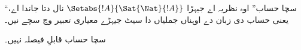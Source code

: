 \documentclass[../../../include/open-logic-section]{subfiles}
\begin{document}
“سچا حساب” اوہ نظریہ اے جیہڑا $\Setabs{!A}{ \Sat{\Nat}{!A}}$
نال دتا جاندا اے، یعنی حساب دی زبان دے اوہناں جملیاں دا سیٹ
جیہڑے معیاری تعبیر وچ سچے نیں۔

\begin{cor}
سچا حساب قابلِ فیصلہ نہیں۔
\end{cor}

\end{document}

